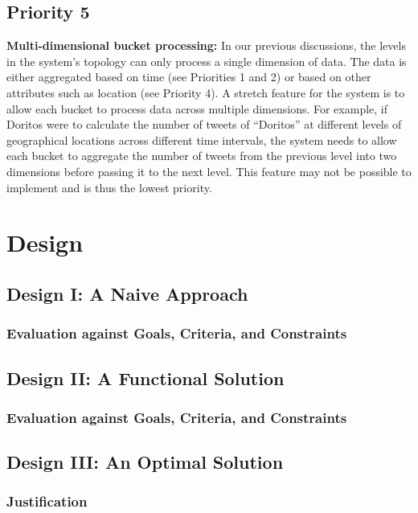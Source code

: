 \documentclass[a4paper]{article}
\begin{document}
\subsection{Priority 5}
{\bf Multi-dimensional bucket processing:} In our previous discussions, the levels in the system’s topology can only process a single dimension of data. The data is either aggregated based on time (see Priorities 1 and 2) or based on other attributes such as location (see Priority 4). A stretch feature for the system is to allow each bucket to process data across multiple dimensions. For example, if Doritos were to calculate the number of tweets of “Doritos” at different levels of geographical locations across different time intervals, the system needs to allow each bucket to aggregate the number of tweets from the previous level into two dimensions before passing it to the next level. This feature may not be possible to implement and is thus the lowest priority.

\section{Design}
\subsection{Design I: A Naive Approach}

\subsubsection{Evaluation against Goals, Criteria, and Constraints}

\subsection{Design II: A Functional Solution}

\subsubsection{Evaluation against Goals, Criteria, and Constraints}

\subsection{Design III: An Optimal Solution}

\subsubsection{Justification}
\end{document}
